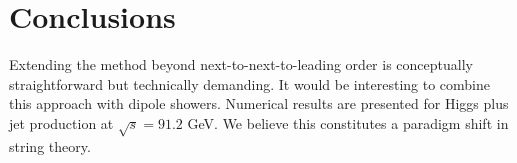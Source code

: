 \section{Conclusions}\label{sec:conclusions}

Extending the method beyond next-to-next-to-leading order is
conceptually straightforward but technically demanding. It would be
interesting to combine this approach with dipole showers. Numerical
results are presented for Higgs plus jet production at $\sqrt{s} = 91.2$
GeV. We believe this constitutes a paradigm shift in string theory.

